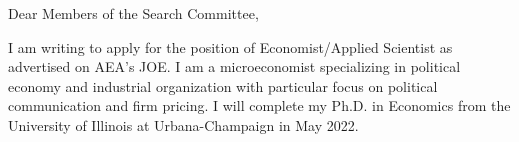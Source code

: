 \documentclass[12pt]{letter}
\begin{document}
\date{}
\begin{letter}{}

\opening{Dear Members of the Search Committee,}

I am writing to apply for the position of Economist/Applied Scientist as advertised on AEA's JOE.
I am a microeconomist specializing in political economy and industrial organization with particular focus on political communication and firm pricing.
I will complete my Ph.D. in Economics from the University of Illinois at Urbana-Champaign in May 2022. 




\end{letter}
\end{document}
